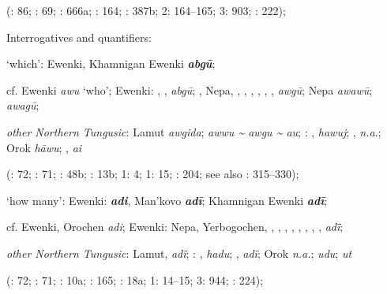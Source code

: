 \documentclass[output=paper,colorlinks,citecolor=brown]{langscibook}
\begin{document}
\begin{xlist}
\begin{xlist}
    (\citealt{Castrén1856}: 86; \citealt{Janhunen1991}: 69; \citealt{Dorji1998}: 666a; \citealt{Chaoke2014a}: 164; \citealt{Vasilevic1958}: 387b; \citealt{Cincius1975B} 2: 164--165; \citealt{Hauer1952} 3: 903; \citealt{Zikmundová2013a}: 222);

\end{xlist}


    \ex Interrogatives and quantifiers:

\begin{xlist}
    \ex ‘which’:  Ewenki, Khamnigan Ewenki \textbf{\textit{abgū}};

    cf.  Ewenki \textit{awu} ‘who’;  Ewenki: , ,  \textit{abgū}; , Nepa, , , , , , ,  \textit{awgū}; Nepa \textit{awawū};  \textit{awagū};

    \textit{other Northern Tungusic}: Lamut \textit{awgida};  \textit{awwu {\textasciitilde} awgu {\textasciitilde} au}; \textit{}: ,  \textit{hawuj}; ,  \textit{n.a}.; Orok \textit{hāwu}; ,  \textit{ai} 
    
    (\citealt{Castrén1856}: 72; \citealt{Janhunen1991}: 71; \citealt{Dorji1998}: 48b; \citealt{Vasilevic1958}: 13b; \citealt{Cincius1975B} 1: 4; \citealt{Hauer1952} 1: 15; \citealt{Zikmundová2013a}: 204; see also \citealt{Hölzl2018a}: 315--330);

    \ex ‘how many’:  Ewenki:  \textbf{\textit{adi}}, Man’kovo \textbf{\textit{adī}}; Khamnigan Ewenki \textbf{\textit{adī}};

    cf.  Ewenki, Orochen \textit{adi};  Ewenki: Nepa, Yerbogochen, , , , , , , , ,  \textit{ad\={ï}};

    \textit{other Northern Tungusic}: Lamut,  \textit{adï}; \textit{}: ,  \textit{hadu}; ,  \textit{adï}; Orok \textit{n.a.};  \textit{udu};  \textit{ut} 
    
    (\citealt{Castrén1856}: 72; \citealt{Janhunen1991}: 71; \citealt{Dorji1998}: 10a; \citealt{Chaoke2014a}: 165; \citealt{Vasilevic1958}: 18a; \citealt{Cincius1975B} 1: 14--15; \citealt{Hauer1952} 3: 944; \citealt{Zikmundová2013a}: 224);


\end{xlist}
\end{xlist}
\end{document}

